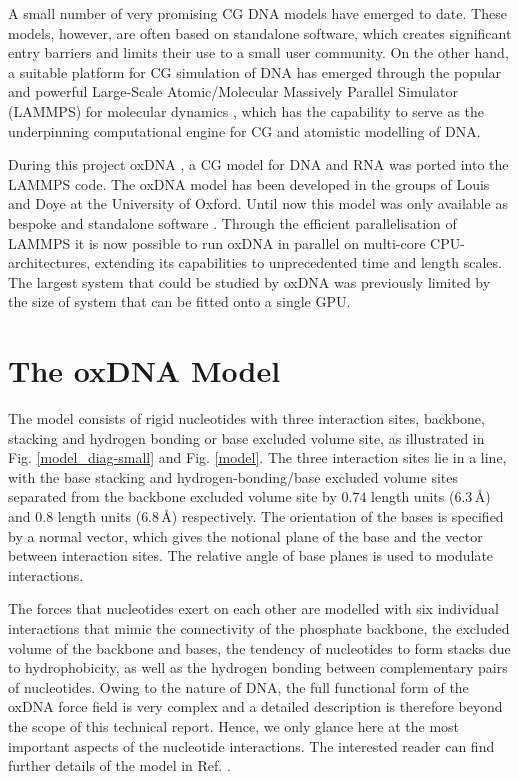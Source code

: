 \documentclass[12pt,onecolumn]{article}
\begin{document}
A small number of very promising CG DNA models have emerged to date. These models, however, are often based on standalone software, which creates significant entry barriers and limits their use to a small user community. On the other hand, a suitable platform for CG simulation of DNA has emerged through the popular and powerful Large-Scale Atomic/Molecular Massively Parallel Simulator (LAMMPS) for molecular dynamics \cite{lammps}, which has the capability to serve as the underpinning computational engine for CG and atomistic modelling of DNA. 

During this project oxDNA \cite{Ouldridge:2011}, a CG model for DNA and RNA was ported into the LAMMPS code. The oxDNA model has been developed in the groups of Louis and Doye at the University of Oxford. Until now this model was only available as bespoke and standalone software \cite{oxdna}. Through the efficient parallelisation of LAMMPS it is now possible to run oxDNA in parallel on multi-core CPU-architectures, extending its capabilities to unprecedented time and length scales. The largest system that could be studied by oxDNA was previously limited by the size of system that can be fitted onto a single GPU.

\section{The oxDNA Model}

The model consists of rigid nucleotides with three interaction sites, backbone, stacking and hydrogen bonding or base excluded volume site, as illustrated in Fig. \ref{model_diag-small} and Fig. \ref{model}. The three interaction sites lie in a line, with the base stacking and hydrogen-bonding/base excluded volume sites separated from the backbone excluded volume site by $0.74$ length units ($6.3$\,\AA) and $0.8$ length units ($6.8$\,\AA)  respectively. The orientation of the bases is specified by a normal vector, which gives the notional plane of the base and the vector between interaction sites. The relative angle of base planes is used to modulate interactions.

The forces that nucleotides exert on each other are modelled with six individual interactions that mimic the connectivity of the phosphate backbone, the excluded volume of the backbone and bases, the tendency of nucleotides to form stacks due to hydrophobicity, as well as the hydrogen bonding between complementary pairs of nucleotides. 
Owing to the nature of DNA, the full functional form of the oxDNA force field is very complex and a detailed description is therefore beyond the scope of this technical report. Hence, we only glance here at the most important aspects of the nucleotide interactions. The interested reader can find further details of the model in Ref. \cite{tom-thesis}.
\end{document}
